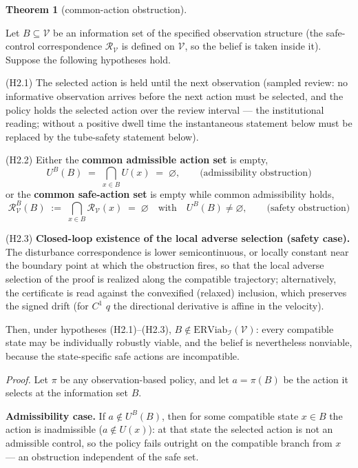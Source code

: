 \documentclass[11pt]{article}
\theoremstyle{definition}
\newtheorem{theorem}{Theorem}
\begin{document}
\begin{theorem}[common-action obstruction]\label{thm:common-action}

Let \(B \subseteq \mathcal{V}\) be an information set of the specified observation structure (the safe-control correspondence
\(\mathcal{R}_{\mathcal{V}}\) is defined on \(\mathcal{V}\), so the
belief is taken inside it). Suppose the following hypotheses hold.

(H2.1) The selected action is held until the next observation (sampled
review: no informative observation arrives before the next action must
be selected, and the policy holds the selected action over the review
interval --- the institutional reading; without a positive dwell time
the instantaneous statement below must be replaced by the tube-safety statement below).

(H2.2) Either the \textbf{common admissible action set} is empty,
\[U^B(B) \;=\; \bigcap_{x \in B} U(x) \;=\; \varnothing, \qquad \text{(admissibility obstruction)}\]
or the \textbf{common safe-action set} is empty while common
admissibility holds,
\[\mathcal{R}_{\mathcal{V}}^B(B) \;:=\; \bigcap_{x \in B} \mathcal{R}_{\mathcal{V}}(x) \;=\; \varnothing \quad \text{with} \quad U^B(B) \neq \varnothing, \tag{1} \qquad \text{(safety obstruction)}\]

(H2.3) \textbf{Closed-loop existence of the local adverse selection
(safety case).} The disturbance correspondence is lower semicontinuous,
or locally constant near the boundary point at which the obstruction
fires, so that the local adverse selection of the proof is realized
along the compatible trajectory; alternatively, the certificate is read
against the convexified (relaxed) inclusion, which preserves the
signed drift (for \(C^1\) \(q\) the directional derivative is affine in the velocity).

Then, under hypotheses (H2.1)--(H2.3),
\(B \notin \mathrm{ERViab}_{\mathcal{I}}(\mathcal{V})\): every
compatible state may be individually robustly viable, and the belief is
nevertheless nonviable, because the state-specific safe actions are
incompatible.

\end{theorem}

\emph{Proof.} Let \(\pi\) be any observation-based policy, and let
\(a = \pi(B)\) be the action it selects at the information set \(B\).

\textbf{Admissibility case.} If \(a \notin U^B(B)\), then for some
compatible state \(x \in B\) the action is inadmissible
(\(a \notin U(x)\)): at that state the selected action is not an
admissible control, so the policy fails outright on the compatible
branch from \(x\) --- an obstruction independent of the safe set.
\end{document}
